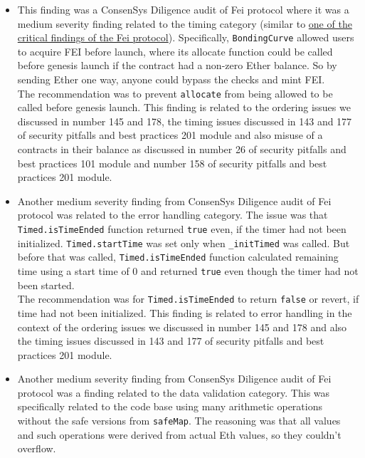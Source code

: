 \begin{itemize}
\item
  This finding was a ConsenSys Diligence audit of Fei protocol where it
  was a medium severity finding related to the timing category (similar
  to \href{5.1_Criticals.md\#Fei}{one of the critical findings of the
  Fei protocol}). Specifically, \texttt{BondingCurve} allowed users to
  acquire FEI before launch, where its allocate function could be called
  before genesis launch if the contract had a non-zero Ether balance. So
  by sending Ether one way, anyone could bypass the checks and mint
  FEI.\\

  The recommendation was to prevent \texttt{allocate} from being allowed
  to be called before genesis launch. This finding is related to the
  ordering issues we discussed in number 145 and 178, the timing issues
  discussed in 143 and 177 of security pitfalls and best practices 201
  module and also misuse of a contracts in their balance as discussed in
  number 26 of security pitfalls and best practices 101 module and
  number 158 of security pitfalls and best practices 201 module.
\item
  Another medium severity finding from ConsenSys Diligence audit of Fei
  protocol was related to the error handling category. The issue was
  that \texttt{Timed.isTimeEnded} function returned \texttt{true} even,
  if the timer had not been initialized. \texttt{Timed.startTime} was
  set only when \texttt{\_initTimed} was called. But before that was
  called, \texttt{Timed.isTimeEnded} function calculated remaining time
  using a start time of 0 and returned \texttt{true} even though the
  timer had not been started.\\

  The recommendation was for \texttt{Timed.isTimeEnded} to return
  \texttt{false} or revert, if time had not been initialized. This
  finding is related to error handling in the context of the ordering
  issues we discussed in number 145 and 178 and also the timing issues
  discussed in 143 and 177 of security pitfalls and best practices 201
  module.
\item
  Another medium severity finding from ConsenSys Diligence audit of Fei
  protocol was a finding related to the data validation category. This
  was specifically related to the code base using many arithmetic
  operations without the safe versions from \texttt{safeMap}. The
  reasoning was that all values and such operations were derived from
  actual Eth values, so they couldn't overflow.\\


\end{itemize}
